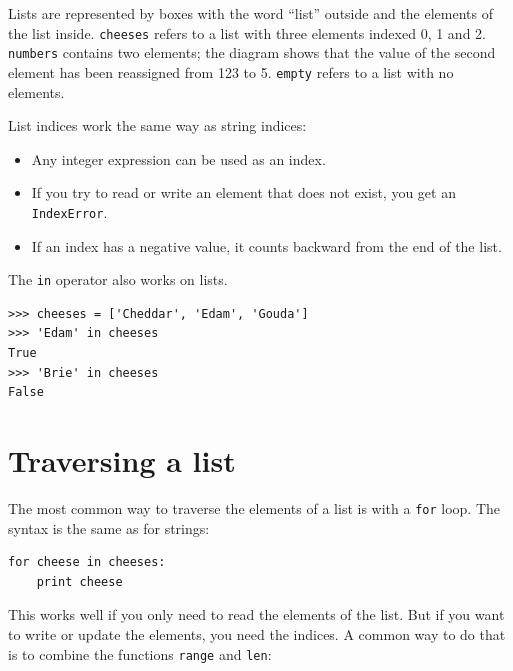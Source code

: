 \documentclass[10pt]{book}
\begin{document}
\begin{CJK}{UTF8}{gbsn}
Lists are represented by boxes with the word ``list'' outside
and the elements of the list inside.  {\tt cheeses} refers to
a list with three elements indexed 0, 1 and 2.
{\tt numbers} contains two elements; the diagram shows that the
value of the second element has been reassigned from 123 to 5.
{\tt empty} refers to a list with no elements.

List indices work the same way as string indices:

\begin{itemize}

\item Any integer expression can be used as an index.

\item If you try to read or write an element that does not exist, you
get an {\tt IndexError}.

\item If an index has a negative value, it counts backward from the
end of the list.

\end{itemize}


The {\tt in} operator also works on lists.

\begin{verbatim}
>>> cheeses = ['Cheddar', 'Edam', 'Gouda']
>>> 'Edam' in cheeses
True
>>> 'Brie' in cheeses
False
\end{verbatim}


\section{Traversing a list}

The most common way to traverse the elements of a list is
with a {\tt for} loop.  The syntax is the same as for strings:

\begin{verbatim}
for cheese in cheeses:
    print cheese
\end{verbatim}
%
This works well if you only need to read the elements of the
list.  But if you want to write or update the elements, you
need the indices.  A common way to do that is to combine
the functions {\tt range} and {\tt len}:


\end{CJK}
\end{document}

